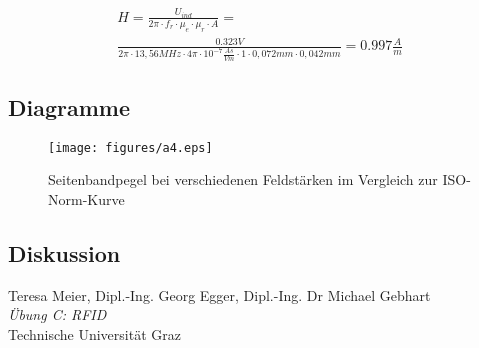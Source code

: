 \documentclass[12pt,a4paper,ngerman]{article}
\begin{document}
\begin{gather}
H = \frac{U_{ind}}{2\pi \cdot f_r \cdot \mu_e \cdot \mu_r \cdot A} = \\
\frac{0.323V}{2\pi \cdot 13,56MHz \cdot 4\pi \cdot 10^{-7}\frac{As}{Vm} \cdot 1 \cdot 0,072mm \cdot 0,042mm} = 0.997 \frac{A}{m}
\end{gather}

\subsection{Diagramme}
\begin{figure}[H]
\centering
\texttt{[image: figures/a4.eps]} 
\caption{Seitenbandpegel bei verschiedenen Feldstärken im Vergleich zur ISO-Norm-Kurve}
\label{fig:a4}
\end{figure}

\subsection{Diskussion}

\begin{thebibliography}{9}

  Teresa Meier, Dipl.-Ing. Georg Egger, Dipl.-Ing. Dr Michael Gebhart\\
  \emph{Übung C: RFID}\\
  Technische Universität Graz
\end{thebibliography}


 



   
\end{document}
